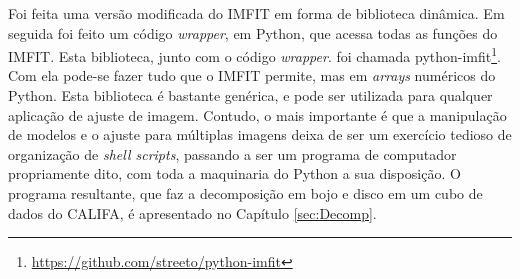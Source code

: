 Foi feita uma versão modificada do IMFIT em forma de biblioteca dinâmica. Em
seguida foi feito um código {\em wrapper}, em Python, que acessa todas as
funções do IMFIT. Esta biblioteca, junto com o código {\em wrapper}. foi chamada
python-imfit\footnote{\url{https://github.com/streeto/python-imfit}}. Com ela
pode-se fazer tudo que o IMFIT permite, mas em {\em arrays} numéricos do Python.
Esta biblioteca é bastante genérica, e pode ser utilizada para qualquer
aplicação de ajuste de imagem. Contudo, o mais importante é que a manipulação de
modelos e o ajuste para múltiplas imagens deixa de ser um exercício tedioso de
organização de {\em shell scripts}, passando a ser um programa de computador
propriamente dito, com toda a maquinaria do Python a sua disposição.
O programa resultante, que faz a decomposição em bojo e disco em um cubo de
dados do CALIFA, é apresentado no Capítulo \ref{sec:Decomp}.

%

